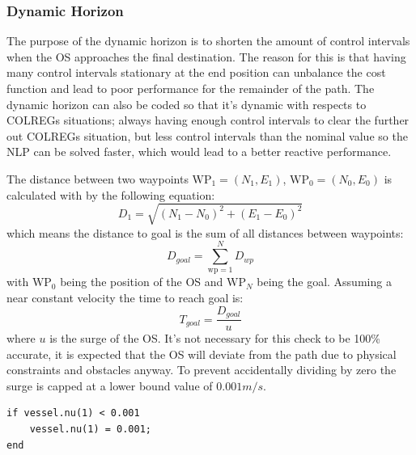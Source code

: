 \subsubsection*{Dynamic Horizon}
The purpose of the dynamic horizon is to shorten the amount of control intervals when the \gls{OS} approaches the final destination. The reason for this
is that having many control intervals stationary at the end position can unbalance the cost function and lead to poor performance for the remainder of the path.
The dynamic horizon can also be coded so that it's dynamic with respects to COLREGs situations; always having enough control intervals to clear the further out
COLREGs situation, but less control intervals than the nominal value so the \gls{NLP} can be solved faster, which would lead to a better reactive performance.

The distance between two waypoints $\textrm{WP}_1 = (N_1, E_1)$,  $\textrm{WP}_0 = (N_0, E_0)$  is calculated with by the following equation:
\begin{equation} \label{EQ: Distancebetweenpoints}
    D_{1} = \sqrt{(N_1 - N_0)^2 + (E_1 - E_0)^2}
\end{equation}
which means the distance to goal is the sum of all distances between waypoints:
\begin{equation}
    D_{goal} = \sum_{\textrm{wp} = 1}^{N} D_{wp}
\end{equation}
with $\textrm{WP}_0$ being the position of the \gls{OS} and $\textrm{WP}_N$ being the goal. Assuming a near constant velocity the time to
reach goal is:
\begin{equation}
    T_{goal} = \frac{D_{goal}}{u}
\end{equation}
where $u$ is the surge of the \gls{OS}. It's not necessary for this check to be 100\% accurate, it is expected that the \gls{OS} will deviate from the
path due to physical constraints and obstacles anyway. To prevent accidentally dividing by zero the surge is capped at a lower bound value of $0.001m/s$.
\begin{lstlisting}
if vessel.nu(1) < 0.001
    vessel.nu(1) = 0.001;
end
\end{lstlisting}

